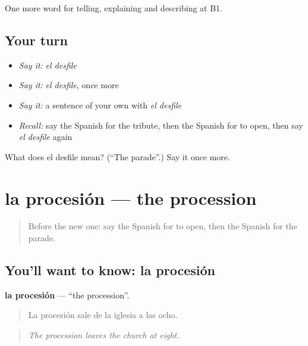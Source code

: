 \begin{grammarlens}[title={What you've built}]
One more word for telling, explaining and describing at B1.
\end{grammarlens}

\subsection*{Your turn}
\begin{itemize}
\raggedright
  \item \emph{Say it:} \emph{el desfile}
  \item \emph{Say it:} \emph{el desfile}, once more
  \item \emph{Say it:} a sentence of your own with \emph{el desfile}
  \item \emph{Recall:} say the Spanish for the tribute, then the Spanish for to open, then say \emph{el desfile} again
\end{itemize}

\begin{tcolorbox}[breakable,colback=teal!4,colframe=teal!35!black,title={Before you move on}]
What does el desfile mean? (\textquotedblleft{}The parade\textquotedblright{}.) Say it once more.
\end{tcolorbox}
\section[la procesión]{la procesión — the procession}

\label{lesson:ES-C559-procesion}



\begin{quote}
Before the new one: say the Spanish for to open, then the Spanish for the parade.
\end{quote}

\subsection*{You'll want to know: la procesión}
\textbf{la procesión} — \textquotedblleft{}the procession\textquotedblright{}.

\begin{quote}
La procesión sale de la iglesia a las ocho.
\end{quote}

\begin{quote}
\emph{The procession leaves the church at eight.}
\end{quote}

